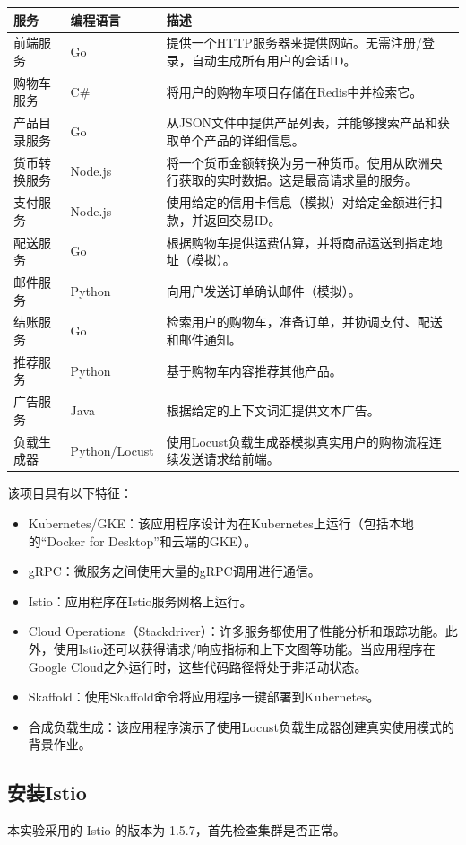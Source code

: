\begin{tabularx}{\textwidth}{|l|l|X|}
	\hline
	\textbf{服务} & \textbf{编程语言} & \textbf{描述} \\
	\hline
	前端服务 & Go & 提供一个HTTP服务器来提供网站。无需注册/登录，自动生成所有用户的会话ID。 \\\hline
	购物车服务 & C\# & 将用户的购物车项目存储在Redis中并检索它。 \\\hline
	产品目录服务 & Go & 从JSON文件中提供产品列表，并能够搜索产品和获取单个产品的详细信息。 \\\hline
	货币转换服务 & Node.js & 将一个货币金额转换为另一种货币。使用从欧洲央行获取的实时数据。这是最高请求量的服务。 \\\hline
	支付服务 & Node.js & 使用给定的信用卡信息（模拟）对给定金额进行扣款，并返回交易ID。 \\\hline
	配送服务 & Go & 根据购物车提供运费估算，并将商品运送到指定地址（模拟）。 \\\hline
	邮件服务 & Python & 向用户发送订单确认邮件（模拟）。 \\\hline
	结账服务 & Go & 检索用户的购物车，准备订单，并协调支付、配送和邮件通知。 \\\hline
	推荐服务 & Python & 基于购物车内容推荐其他产品。 \\\hline
	广告服务 & Java & 根据给定的上下文词汇提供文本广告。 \\\hline
	负载生成器 & Python/Locust & 使用Locust负载生成器模拟真实用户的购物流程连续发送请求给前端。 \\
	\hline
\end{tabularx}
该项目具有以下特征：
\begin{itemize}
	\item Kubernetes/GKE：该应用程序设计为在Kubernetes上运行（包括本地的“Docker for Desktop”和云端的GKE）。
	\item gRPC：微服务之间使用大量的gRPC调用进行通信。
	\item Istio：应用程序在Istio服务网格上运行。
	\item Cloud Operations（Stackdriver）：许多服务都使用了性能分析和跟踪功能。此外，使用Istio还可以获得请求/响应指标和上下文图等功能。当应用程序在Google Cloud之外运行时，这些代码路径将处于非活动状态。
	\item Skaffold：使用Skaffold命令将应用程序一键部署到Kubernetes。
	\item 合成负载生成：该应用程序演示了使用Locust负载生成器创建真实使用模式的背景作业。
\end{itemize}
\subsection{安装Istio}
本实验采用的 Istio 的版本为 1.5.7，首先检查集群是否正常。

